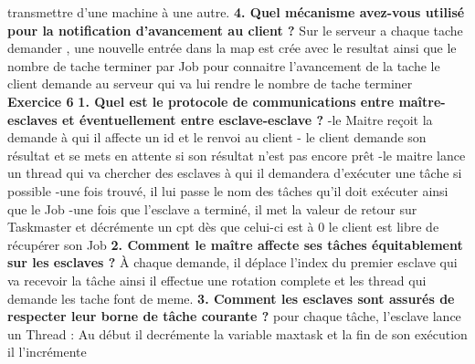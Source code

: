 \documentclass{article}
\begin{document}
transmettre d'une machine à une autre.
\newline
\newline
\textbf{4. Quel mécanisme avez-vous utilisé pour la notification d’avancement au client ?}
\newline
\newline
Sur le serveur a chaque tache demander , une nouvelle entrée dans la map est crée avec le resultat ainsi que le nombre de tache terminer par Job
pour connaitre l'avancement de la tache le client demande au serveur qui va lui rendre le nombre de tache terminer
\newline
\newline
\textbf{Exercice 6}
\newline
\newline
\textbf{1. Quel est le protocole de communications entre maître-esclaves et éventuellement entre
esclave-esclave ?}
-le Maitre reçoit la demande à qui il affecte un id et le renvoi au client 
- le client demande son résultat et se mets en attente si son résultat n'est pas encore prêt 
-le maitre lance un thread qui va chercher  des esclaves à qui il demandera d'exécuter une tâche si possible 
-une fois trouvé, il lui passe le nom des tâches qu'il doit exécuter ainsi que le Job
-une fois que l'esclave a terminé, il met la valeur de retour sur Taskmaster et décrémente un cpt dès que celui-ci est à 0 le client est libre de récupérer son Job
\newline
\newline
\textbf{2. Comment le maître affecte ses tâches équitablement sur les esclaves ?}
\newline
À chaque demande, il déplace l'index du premier esclave qui va recevoir la tâche ainsi il effectue une rotation complete et les thread qui demande 
les tache font de meme.
\newline
\newline
\textbf{3. Comment les esclaves sont assurés de respecter leur borne de tâche courante ?}
\newline
\newline
pour chaque tâche, l'esclave lance un Thread : Au début il decrémente la variable maxtask et la fin de son exécution il l'incrémente
\newline
\newline
\end{document}
